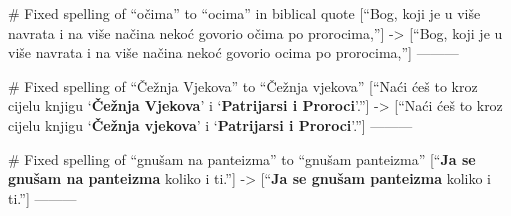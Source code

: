 # Fixed spelling of “očima” to “ocima” in biblical quote
[“Bog, koji je u više navrata i na više načina nekoć govorio očima po prorocima,”]
->
[“Bog, koji je u više navrata i na više načina nekoć govorio ocima po prorocima,”]
---------

# Fixed spelling of “Čežnja Vjekova” to “Čežnja vjekova”
[“Naći ćeš to kroz cijelu knjigu ‘\textbf{Čežnja Vjekova}’ i ‘\textbf{Patrijarsi i Proroci}’.”]
->
[“Naći ćeš to kroz cijelu knjigu ‘\textbf{Čežnja vjekova}’ i ‘\textbf{Patrijarsi i Proroci}’.”]
---------

# Fixed spelling of “gnušam na panteizma” to “gnušam panteizma”
[“\textbf{Ja se gnušam na panteizma} koliko i ti.”]
->
[“\textbf{Ja se gnušam panteizma} koliko i ti.”]
---------